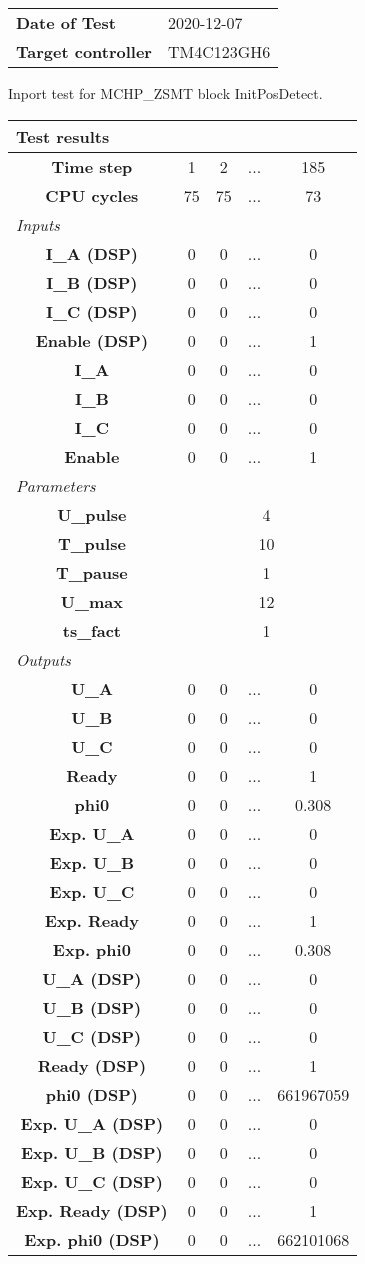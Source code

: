 \begin{tabular}{l l}
\textbf{Date of Test} & 2020-12-07 \tabularnewline
\textbf{Target controller} & TM4C123GH6 \tabularnewline
\end{tabular}
\vspace{1ex}
Inport test for MCHP_ZSMT block InitPosDetect.

\vspace{1em}
\begin{tabularx}{\textwidth}{|c|c|c|>{\centering\arraybackslash}X|c|}
\hline
\multicolumn{5}{|l|}{\cellcolor[gray]{0.8}\textbf{Test results}} \tabularnewline \hline
\textbf{Time step} & 1 & 2 & ... & 185 \tabularnewline \hline
\textbf{CPU cycles} & 75 & 75 & ... & 73 \tabularnewline \hline
\multicolumn{5}{|l|}{\cellcolor[gray]{0.9}\textit{Inputs}} \tabularnewline \hline
\textbf{I\_A (DSP)} & 0 & 0 & ... & 0 \tabularnewline \hline
\textbf{I\_B (DSP)} & 0 & 0 & ... & 0 \tabularnewline \hline
\textbf{I\_C (DSP)} & 0 & 0 & ... & 0 \tabularnewline \hline
\textbf{Enable (DSP)} & 0 & 0 & ... & 1 \tabularnewline \hline
\textbf{I\_A} & 0 & 0 & ... & 0 \tabularnewline \hline
\textbf{I\_B} & 0 & 0 & ... & 0 \tabularnewline \hline
\textbf{I\_C} & 0 & 0 & ... & 0 \tabularnewline \hline
\textbf{Enable} & 0 & 0 & ... & 1 \tabularnewline \hline
\multicolumn{5}{|l|}{\cellcolor[gray]{0.9}\textit{Parameters}} \tabularnewline \hline
\textbf{U\_pulse} & \multicolumn{4}{c|}{4} \tabularnewline \hline
\textbf{T\_pulse} & \multicolumn{4}{c|}{10} \tabularnewline \hline
\textbf{T\_pause} & \multicolumn{4}{c|}{1} \tabularnewline \hline
\textbf{U\_max} & \multicolumn{4}{c|}{12} \tabularnewline \hline
\textbf{ts\_fact} & \multicolumn{4}{c|}{1} \tabularnewline \hline
\multicolumn{5}{|l|}{\cellcolor[gray]{0.9}\textit{Outputs}} \tabularnewline \hline
\textbf{U\_A} & 0 & 0 & ... & 0 \tabularnewline \hline
\textbf{U\_B} & 0 & 0 & ... & 0 \tabularnewline \hline
\textbf{U\_C} & 0 & 0 & ... & 0 \tabularnewline \hline
\textbf{Ready} & 0 & 0 & ... & 1 \tabularnewline \hline
\textbf{phi0} & 0 & 0 & ... & 0.308 \tabularnewline \hline
\textbf{Exp. U\_A} & 0 & 0 & ... & 0 \tabularnewline \hline
\textbf{Exp. U\_B} & 0 & 0 & ... & 0 \tabularnewline \hline
\textbf{Exp. U\_C} & 0 & 0 & ... & 0 \tabularnewline \hline
\textbf{Exp. Ready} & 0 & 0 & ... & 1 \tabularnewline \hline
\textbf{Exp. phi0} & 0 & 0 & ... & 0.308 \tabularnewline \hline
\textbf{U\_A (DSP)} & 0 & 0 & ... & 0 \tabularnewline \hline
\textbf{U\_B (DSP)} & 0 & 0 & ... & 0 \tabularnewline \hline
\textbf{U\_C (DSP)} & 0 & 0 & ... & 0 \tabularnewline \hline
\textbf{Ready (DSP)} & 0 & 0 & ... & 1 \tabularnewline \hline
\textbf{phi0 (DSP)} & 0 & 0 & ... & 661967059 \tabularnewline \hline
\textbf{Exp. U\_A (DSP)} & 0 & 0 & ... & 0 \tabularnewline \hline
\textbf{Exp. U\_B (DSP)} & 0 & 0 & ... & 0 \tabularnewline \hline
\textbf{Exp. U\_C (DSP)} & 0 & 0 & ... & 0 \tabularnewline \hline
\textbf{Exp. Ready (DSP)} & 0 & 0 & ... & 1 \tabularnewline \hline
\textbf{Exp. phi0 (DSP)} & 0 & 0 & ... & 662101068 \tabularnewline \hline
\end{tabularx}
\vspace{1ex}

